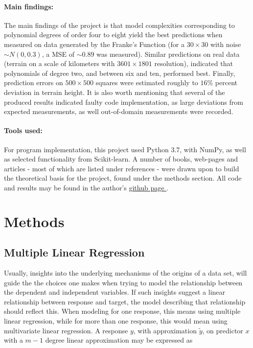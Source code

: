 \documentclass[%
oneside,                 %
final,                   %
10pt]{article}
\begin{document}
\paragraph{Main findings:}
The main findings of the project is that model complexities corresponding to polynomial degrees of order four to eight yield the best predictions when measured on data generated by the Franke's Function (for   a $30 \times 30$ with  noise $\sim N(0,0.3)$, a MSE of $\sim 0.89$ was measured). Similar predictions on real data (terrain on a scale of kilometers with $3601 \times 1801$ resolution), indicated that polynomials of degree two, and between six and ten, performed best. Finally, prediction errors on $500 \times 500$ squares were estimated roughly to $16\%$ percent deviation in terrain height. It is also worth mentioning that several of the produced results indicated faulty code implementation, as large deviations from expected measurements, as well out-of-domain measurements were recorded.

\paragraph{Tools used:} 
For program implementation, this project used Python 3.7, with NumPy, as well as selected functionality from Scikit-learn. A number of books, web-pages and articles - most of which are listed under references - were drawn upon to build the theoretical basis for the project, found under the methods section.
All code and results may be found in the author's \href{https://github.com/johanere/FYS-STK4155/tree/master/Project1}{github page }.



\section{Methods}
\subsection{Multiple Linear Regression}
Usually, insights into the underlying mechanisms of the origins of a data set, will guide the the choices one makes when trying to model the relationship between the dependent and independent variables. If such insights suggest a linear relationship between response and target, the model describing that relationship should reflect this. When modeling for one response, this means using multiple linear regression, while for more than one response, this would mean using multivariate linear regression. A response $y$, with approximation $\tilde{y}$, on predictor $x$ with a $m-1$ degree linear approximation may be expressed as
\end{document}
